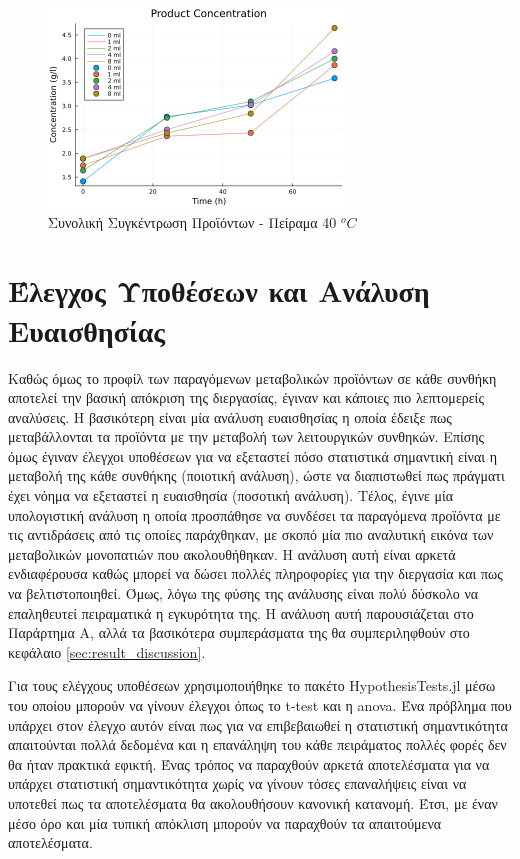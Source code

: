 \documentclass[11pt]{report}
\begin{document}
\begin{enumerate}
\begin{figure}[htbp]
\centering
\includegraphics[width=300px]{../plots/28_11/product_conc_scatter_28_11.png}
\caption{\label{fig:orga0f8cf8}Συνολική Συγκέντρωση Προϊόντων - Πείραμα 40 \(^oC\)}
\end{figure}
\end{enumerate}

\section{Έλεγχος Υποθέσεων και Ανάλυση Ευαισθησίας}
\label{sec:org77b419c}
Καθώς όμως το προφίλ των παραγόμενων μεταβολικών προϊόντων σε κάθε συνθήκη αποτελεί την βασική απόκριση της διεργασίας, έγιναν και κάποιες πιο λεπτομερείς αναλύσεις. Η βασικότερη είναι μία ανάλυση ευαισθησίας η οποία έδειξε πως μεταβάλλονται τα προϊόντα με την μεταβολή των λειτουργικών συνθηκών. Επίσης όμως έγιναν έλεγχοι υποθέσεων για να εξεταστεί πόσο στατιστικά σημαντική είναι η μεταβολή της κάθε συνθήκης (ποιοτική ανάλυση), ώστε να διαπιστωθεί πως πράγματι έχει νόημα να εξεταστεί η ευαισθησία (ποσοτική ανάλυση). Τέλος, έγινε μία υπολογιστική ανάλυση η οποία προσπάθησε να συνδέσει τα παραγόμενα προϊόντα με τις αντιδράσεις από τις οποίες παράχθηκαν, με σκοπό μία πιο αναλυτική εικόνα των μεταβολικών μονοπατιών που ακολουθήθηκαν. Η ανάλυση αυτή είναι αρκετά ενδιαφέρουσα καθώς μπορεί να δώσει πολλές πληροφορίες για την διεργασία και πως να βελτιστοποιηθεί. Όμως, λόγω της φύσης της ανάλυσης είναι πολύ δύσκολο να επαληθευτεί πειραματικά η εγκυρότητα της. Η ανάλυση αυτή παρουσιάζεται στο Παράρτημα Α, αλλά τα βασικότερα συμπεράσματα της θα συμπεριληφθούν στο κεφάλαιο \autoref{sec:result_discussion}.

Για τους ελέγχους υποθέσεων χρησιμοποιήθηκε το πακέτο HypothesisTests.jl μέσω του οποίου μπορούν να γίνουν έλεγχοι όπως το t-test και η \acrfull{anova}. Ένα πρόβλημα που υπάρχει στον έλεγχο αυτόν είναι πως για να επιβεβαιωθεί η στατιστική σημαντικότητα απαιτούνται πολλά δεδομένα και η επανάληψη του κάθε πειράματος πολλές φορές δεν θα ήταν πρακτικά εφικτή. Ένας τρόπος να παραχθούν αρκετά αποτελέσματα για να υπάρχει στατιστική σημαντικότητα χωρίς να γίνουν τόσες επαναλήψεις είναι να υποτεθεί πως τα αποτελέσματα θα ακολουθήσουν κανονική κατανομή. Έτσι, με έναν μέσο όρο και μία τυπική απόκλιση μπορούν να παραχθούν τα απαιτούμενα αποτελέσματα.
\end{document}
